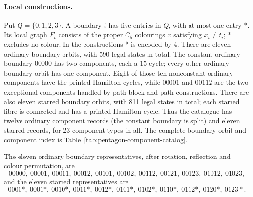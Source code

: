 \documentclass[11pt]{article}
\theoremstyle{remark}
\numberwithin{equation}{section}
\numberwithin{table}{section}
\begin{document}
\paragraph{Local constructions.}
Put $Q=\{0,1,2,3\}$. A boundary $t$ has five entries in $Q$, with at most
one entry $\ast$. Its local graph $F_t$ consists of the proper $C_5$
colourings $x$ satisfying $x_i\ne t_i$; $\ast$ excludes no colour.
In the constructions $\ast$ is encoded by 4.
There are eleven ordinary boundary orbits, with 590 legal states in
total. The constant ordinary boundary $00000$ has two components, each
a $15$-cycle; every other ordinary boundary orbit has one component.
Eight of those ten nonconstant ordinary components have the printed
Hamilton cycles, while $00001$ and $00112$ are the two exceptional components
handled by path-block and path constructions. There are also eleven
starred boundary orbits, with 811 legal states in total; each starred
fibre is connected and has a printed Hamilton cycle. Thus the catalogue
has twelve ordinary component records (the constant boundary is split)
and eleven starred records, for 23 component types in all. The complete
boundary-orbit and component index is Table~\ref{tab:pentagon-component-catalog}.

The eleven ordinary boundary representatives, after rotation, reflection
and colour permutation, are
\[
00000,\ 00001,\ 00011,\ 00012,\ 00101,\ 00102,\ 00112,\
00121,\ 00123,\ 01012,\ 01023,
\]
and the eleven starred representatives are
\[
0000\ast,\ 0001\ast,\ 0010\ast,\ 0011\ast,\ 0012\ast,\
0101\ast,\ 0102\ast,\ 0110\ast,\ 0112\ast,\ 0120\ast,\ 0123\ast.
\]
\end{document}
